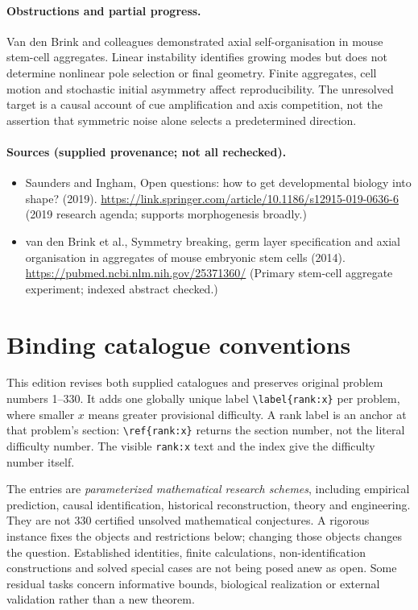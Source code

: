 \documentclass[11pt]{article}
\begin{document}
\paragraph{Obstructions and partial progress.} Van den Brink and colleagues demonstrated axial self-organisation in mouse stem-cell aggregates. Linear instability identifies growing modes but does not determine nonlinear pole selection or final geometry. Finite aggregates, cell motion and stochastic initial asymmetry affect reproducibility. The unresolved target is a causal account of cue amplification and axis competition, not the assertion that symmetric noise alone selects a predetermined direction.
\paragraph{Sources (supplied provenance; not all rechecked).} \begin{itemize}
\item Saunders and Ingham, Open questions: how to get developmental biology into shape? (2019). \url{https://link.springer.com/article/10.1186/s12915-019-0636-6} (2019 research agenda; supports morphogenesis broadly.)
\item van den Brink et al., Symmetry breaking, germ layer specification and axial organisation in aggregates of mouse embryonic stem cells (2014). \url{https://pubmed.ncbi.nlm.nih.gov/25371360/} (Primary stem-cell aggregate experiment; indexed abstract checked.)
\end{itemize}


\section*{Binding catalogue conventions}
This edition revises both supplied catalogues and preserves original problem numbers 1--330. It adds one globally unique label \verb|\label{rank:x}| per problem, where smaller $x$ means greater provisional difficulty. A rank label is an anchor at that problem's section: \verb|\ref{rank:x}| returns the section number, not the literal difficulty number. The visible \texttt{rank:x} text and the index give the difficulty number itself.

The entries are \emph{parameterized mathematical research schemes}, including empirical prediction, causal identification, historical reconstruction, theory and engineering. They are not 330 certified unsolved mathematical conjectures. A rigorous instance fixes the objects and restrictions below; changing those objects changes the question. Established identities, finite calculations, non-identification constructions and solved special cases are not being posed anew as open. Some residual tasks concern informative bounds, biological realization or external validation rather than a new theorem.
\end{document}
